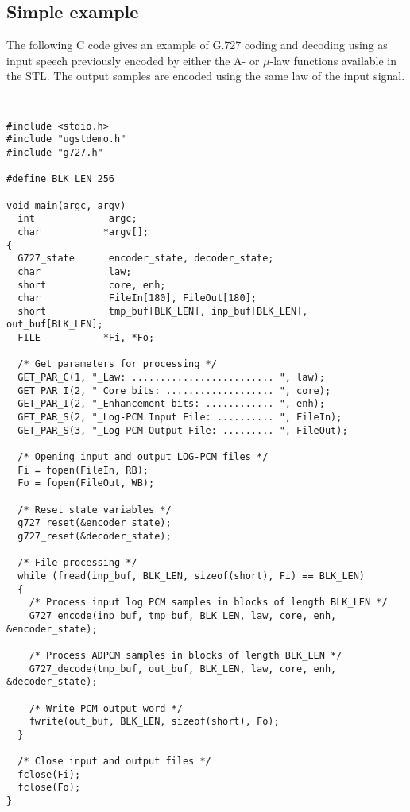 \subsection {Simple example}

The following C code gives an example of G.727 coding and decoding
using as input speech previously encoded by either the A- or
$\mu$-law functions available in the STL. The output samples are
encoded using the same law of the input signal.

{\tt\small
\begin{verbatim}
#include <stdio.h>
#include "ugstdemo.h"
#include "g727.h"

#define BLK_LEN 256

void main(argc, argv)
  int             argc;
  char           *argv[];
{
  G727_state      encoder_state, decoder_state;
  char            law;
  short           core, enh;
  char            FileIn[180], FileOut[180];
  short           tmp_buf[BLK_LEN], inp_buf[BLK_LEN], out_buf[BLK_LEN];
  FILE           *Fi, *Fo;

  /* Get parameters for processing */
  GET_PAR_C(1, "_Law: ......................... ", law);
  GET_PAR_I(2, "_Core bits: ................... ", core);
  GET_PAR_I(2, "_Enhancement bits: ............ ", enh);
  GET_PAR_S(2, "_Log-PCM Input File: .......... ", FileIn);
  GET_PAR_S(3, "_Log-PCM Output File: ......... ", FileOut);

  /* Opening input and output LOG-PCM files */
  Fi = fopen(FileIn, RB);
  Fo = fopen(FileOut, WB);

  /* Reset state variables */
  g727_reset(&encoder_state);
  g727_reset(&decoder_state);

  /* File processing */
  while (fread(inp_buf, BLK_LEN, sizeof(short), Fi) == BLK_LEN)
  {
    /* Process input log PCM samples in blocks of length BLK_LEN */
    G727_encode(inp_buf, tmp_buf, BLK_LEN, law, core, enh, &encoder_state);

    /* Process ADPCM samples in blocks of length BLK_LEN */
    G727_decode(tmp_buf, out_buf, BLK_LEN, law, core, enh, &decoder_state);

    /* Write PCM output word */
    fwrite(out_buf, BLK_LEN, sizeof(short), Fo);
  }

  /* Close input and output files */
  fclose(Fi);
  fclose(Fo);
}
\end{verbatim}
}
